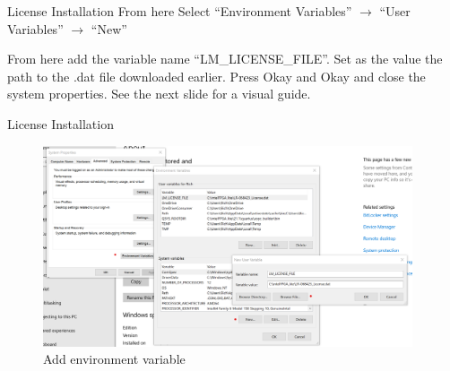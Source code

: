 \documentclass[fleqn]{beamer}
\newcommand{\quotes}[1]{``#1''}
\begin{document}
\begin{frame}{License Installation}
    From here Select \quotes{Environment Variables} $\longrightarrow$ \quotes{User Variables} $\longrightarrow$ \quotes{New}\par
    From here add the variable name \quotes{LM\_LICENSE\_FILE}. Set as the value the path to the .dat file downloaded earlier. Press Okay and Okay and close the system properties. See the next slide for a visual guide.
\end{frame}
\begin{frame}{License Installation}
    \begin{figure}
        \centering
        \includegraphics[height=16em]{figures/envvars.png}
        \caption{Add environment variable}
        \label{fig:my_label}
    \end{figure}
\end{frame}
\end{document}
